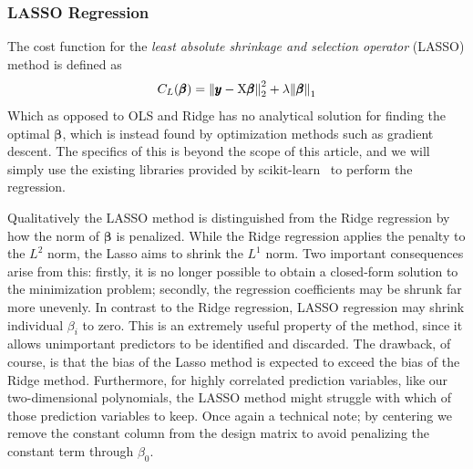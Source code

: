\documentclass[reprint, english, nofootinbib]{revtex4-2}
\begin{document}
        \subsubsection{LASSO Regression}
            The cost function for the \textit{least absolute shrinkage and selection operator} (LASSO) method is defined as
            \begin{equation}
                C_L(\pmb \beta) =
                \norm{\pmb y - \textup{X}\pmb{\beta}}_2^2
                + \lambda\norm{\pmb{\beta}}_1
            \end{equation}
            Which as opposed to OLS and Ridge has no analytical solution for finding the optimal $\pmb \beta$, which is instead found by optimization methods such as gradient descent. The specifics of this is beyond the scope of this article, and we will simply use the existing libraries provided by scikit-learn~\cite{scikit-learn} to perform the regression.

            Qualitatively the LASSO method is distinguished from the Ridge regression by how the norm of $\pmb{\beta}$ is penalized. While the Ridge regression applies the penalty to the $L^2$ norm, the Lasso aims to shrink the $L^1$ norm. Two important consequences arise from this: firstly, it is no longer possible to obtain a closed-form solution to the minimization problem; secondly, the regression coefficients may be shrunk far more unevenly. In contrast to the Ridge regression, LASSO regression may shrink individual $\beta_{i}$ to zero. This is an extremely useful property of the method, since it allows unimportant predictors to be identified and discarded. The drawback, of course, is that the bias of the Lasso method is expected to exceed the bias of the Ridge method. Furthermore, for highly correlated prediction variables, like our two-dimensional polynomials, the LASSO method might struggle with which of those prediction variables to keep. Once again a technical note; by centering we remove the constant column from the design matrix to avoid penalizing the constant term through $\beta_{0}$.
\end{document}
